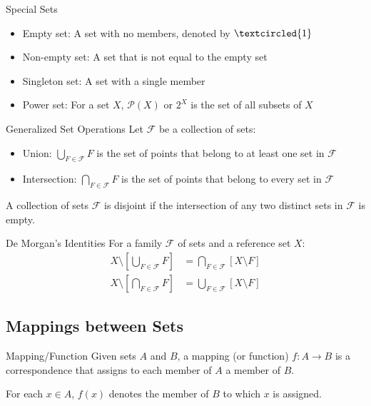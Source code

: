 \begin{definitionbox}{Special Sets}
\begin{itemize}
    \item Empty set: A set with no members, denoted by $\textcircled{1}$
    \item Non-empty set: A set that is not equal to the empty set
    \item Singleton set: A set with a single member
    \item Power set: For a set $X$, $\mathcal{P}(X)$ or $2^X$ is the set of all subsets of $X$
\end{itemize}
\end{definitionbox}

\begin{definitionbox}{Generalized Set Operations}
Let $\mathcal{F}$ be a collection of sets:
\begin{itemize}
    \item Union: $\bigcup_{F\in\mathcal{F}}F$ is the set of points that belong to at least one set in $\mathcal{F}$
    \item Intersection: $\bigcap_{F\in\mathcal{F}}F$ is the set of points that belong to every set in $\mathcal{F}$
\end{itemize}

A collection of sets $\mathcal{F}$ is disjoint if the intersection of any two distinct sets in $\mathcal{F}$ is empty.
\end{definitionbox}

\begin{theorembox}{De Morgan's Identities}
For a family $\mathcal{F}$ of sets and a reference set $X$:
\begin{align*}
    X \setminus \left[\bigcup_{F\in\mathcal{F}}F\right] &= \bigcap_{F\in\mathcal{F}}[X \setminus F] \\
    X \setminus \left[\bigcap_{F\in\mathcal{F}}F\right] &= \bigcup_{F\in\mathcal{F}}[X \setminus F]
\end{align*}
\end{theorembox}

\subsection{Mappings between Sets}

\begin{definitionbox}{Mapping/Function}
Given sets $A$ and $B$, a mapping (or function) $f: A \to B$ is a correspondence that assigns to each member of $A$ a member of $B$. 

For each $x \in A$, $f(x)$ denotes the member of $B$ to which $x$ is assigned.
\end{definitionbox}

